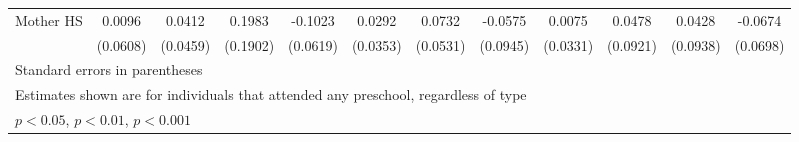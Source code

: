 \begin{table}[htbp]
\begin{tabular}{l*{11}{c}}
\addlinespace
Mother HS   &      0.0096         &      0.0412         &      0.1983         &     -0.1023         &      0.0292         &      0.0732         &     -0.0575         &      0.0075         &      0.0478         &      0.0428         &     -0.0674         \\
            &    (0.0608)         &    (0.0459)         &    (0.1902)         &    (0.0619)         &    (0.0353)         &    (0.0531)         &    (0.0945)         &    (0.0331)         &    (0.0921)         &    (0.0938)         &    (0.0698)         \\
\bottomrule
\multicolumn{12}{l}{\footnotesize Standard errors in parentheses}\\
\multicolumn{12}{l}{\footnotesize Estimates shown are for individuals that attended any preschool, regardless of type}\\
\multicolumn{12}{l}{\footnotesize \sym{*} \(p<0.05\), \sym{**} \(p<0.01\), \sym{***} \(p<0.001\)}\\
\end{tabular}
\end{table}
